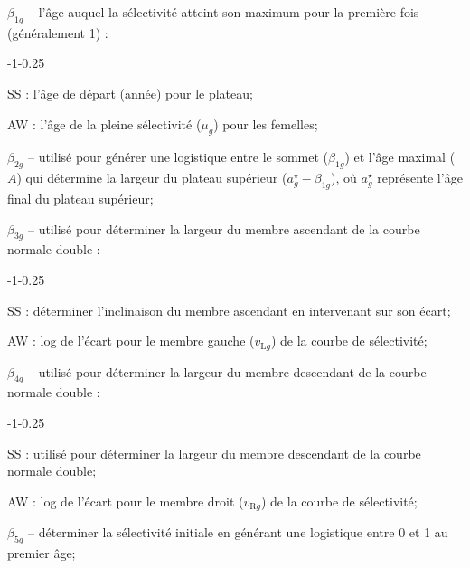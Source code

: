 \documentclass[11pt]{book}
\newcommand{\mr}[1]{\mathrm{#1}}
\begin{document}
\begin{enumerate_itemize}{}{}
  \item $\beta_{1g}$ -- l'\^{a}ge auquel la s\'{e}lectivit\'{e} atteint son maximum pour la premi\`{e}re fois (g\'{e}n\'{e}ralement 1) :
    \begin{enumerate_itemize}{-1}{-0.25}
      \item SS : l'\^{a}ge de d\'{e}part (ann\'{e}e) pour le plateau;
      \item AW : l'\^{a}ge de la pleine s\'{e}lectivit\'{e} ($\mu_g$) pour les femelles;
    \end{enumerate_itemize}
  \item $\beta_{2g}$ -- utilis\'{e} pour g\'{e}n\'{e}rer une logistique entre le sommet ($\beta_{1g}$) et l'\^{a}ge maximal ($A$) qui d\'{e}termine la largeur du plateau sup\'{e}rieur ($a_g^{\star} - \beta_{1g}$), o\`{u} $a_g^{\star}$ repr\'{e}sente l'\^{a}ge final du plateau sup\'{e}rieur;
  \item $\beta_{3g}$ -- utilis\'{e} pour d\'{e}terminer la largeur du membre ascendant de la courbe normale double :
    \begin{enumerate_itemize}{-1}{-0.25}
      \item SS : d\'{e}terminer l'inclinaison du membre ascendant en intervenant sur son \'{e}cart;
      \item AW : log de l'\'{e}cart pour le membre gauche ($v_{\mr{L}g}$) de la courbe de s\'{e}lectivit\'{e};
    \end{enumerate_itemize}
  \item $\beta_{4g}$ -- utilis\'{e} pour d\'{e}terminer la largeur du membre descendant de la courbe normale double :
    \begin{enumerate_itemize}{-1}{-0.25}
      \item SS : utilis\'{e} pour d\'{e}terminer la largeur du membre descendant de la courbe normale double;
      \item AW : log de l'\'{e}cart pour le membre droit ($v_{\mr{R}g}$) de la courbe de s\'{e}lectivit\'{e};
    \end{enumerate_itemize}
  \item $\beta_{5g}$ -- d\'{e}terminer la s\'{e}lectivit\'{e} initiale en g\'{e}n\'{e}rant une logistique entre 0 et 1 au premier \^{a}ge;

\end{enumerate_itemize}
\end{document}
